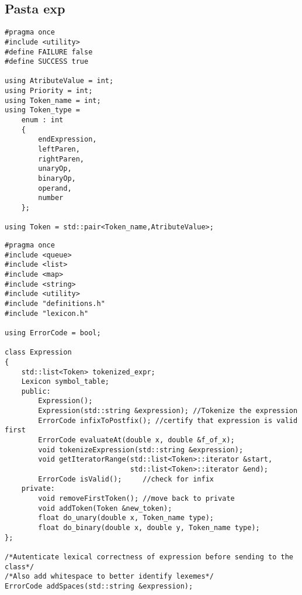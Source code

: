 \documentclass[12pt, letterpaper]{article}
\begin{document}
\newpage
\subsection{Pasta exp}

\begin{spacing}{2.5}
\end{spacing}

\begin{lstlisting}[caption=definition.h]
#pragma once
#include <utility>
#define FAILURE false
#define SUCCESS true

using AtributeValue = int;
using Priority = int;
using Token_name = int;
using Token_type = 
    enum : int
    {
        endExpression,
        leftParen,
        rightParen,
        unaryOp,
        binaryOp,
        operand,
        number
    };

using Token = std::pair<Token_name,AtributeValue>;
\end{lstlisting}

\begin{spacing}{3.5}
\end{spacing}

\begin{lstlisting}[caption=expression.h]
#pragma once
#include <queue>
#include <list>
#include <map>
#include <string>
#include <utility>
#include "definitions.h"
#include "lexicon.h"

using ErrorCode = bool;

class Expression
{
    std::list<Token> tokenized_expr;
    Lexicon symbol_table;
    public:
        Expression();
        Expression(std::string &expression); //Tokenize the expression
        ErrorCode infixToPostfix(); //certify that expression is valid first
        ErrorCode evaluateAt(double x, double &f_of_x);
        void tokenizeExpression(std::string &expression);
        void getIteratorRange(std::list<Token>::iterator &start,
                              std::list<Token>::iterator &end); 
        ErrorCode isValid();     //check for infix
    private:
        void removeFirstToken(); //move back to private
        void addToken(Token &new_token);
        float do_unary(double x, Token_name type);
        float do_binary(double x, double y, Token_name type);
};

/*Autenticate lexical correctness of expression before sending to the class*/
/*Also add whitespace to better identify lexemes*/
ErrorCode addSpaces(std::string &expression);

\end{lstlisting}
\end{document}
